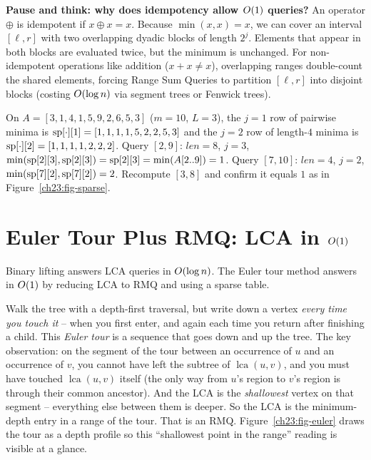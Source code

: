 \begin{recoverybox}
\textbf{Pause and think: why does idempotency allow $O(1)$ queries?}
An operator $\oplus$ is idempotent if $x \oplus x = x$. Because $\min(x, x) = x$, we can cover an interval $[\ell, r]$ with two overlapping dyadic blocks of length $2^j$. Elements that appear in both blocks are evaluated twice, but the minimum is unchanged. For non-idempotent operations like addition ($x + x \neq x$), overlapping ranges double-count the shared elements, forcing Range Sum Queries to partition $[\ell, r]$ into disjoint blocks (costing $O(\log n)$ via segment trees or Fenwick trees).
\end{recoverybox}

\begin{labbox}
On $A=[3,1,4,1,5,9,2,6,5,3]$ ($m=10$, $L=3$), the $j=1$ row of pairwise minima is
$\mathrm{sp}[\cdot][1]=[1,1,1,1,5,2,2,5,3]$ and the $j=2$ row of length-$4$ minima is
$\mathrm{sp}[\cdot][2]=[1,1,1,1,2,2,2]$. Query $[2,9]$: $\textit{len}=8$, $j=3$,
$\min(\mathrm{sp}[2][3],\mathrm{sp}[2][3])=\mathrm{sp}[2][3]=\min(A[2..9])=1$. Query $[7,10]$: $\textit{len}=4$,
$j=2$, $\min(\mathrm{sp}[7][2],\mathrm{sp}[7][2])=2$. Recompute $[3,8]$ and confirm it equals $1$ as in
Figure~\ref{ch23:fig-sparse}.
\end{labbox}

\section{Euler Tour Plus RMQ: LCA in \texorpdfstring{$O(1)$}{O(1)}}
\label{ch23:euler-lca}

Binary lifting answers LCA queries in $O(\log n)$. The Euler tour method answers in $O(1)$ by reducing LCA to RMQ and using a sparse table.

\begin{intuitionbox}
Walk the tree with a depth-first traversal, but write down a vertex \emph{every time you
touch it} -- when you first enter, and again each time you return after finishing a child.
This \emph{Euler tour} is a sequence that goes down and up the tree. The key
observation: on the segment of the tour between an occurrence of $u$ and an occurrence of
$v$, you cannot have left the subtree of $\operatorname{lca}(u,v)$, and you must have touched
$\operatorname{lca}(u,v)$ itself (the only way from $u$'s region to $v$'s region is through
their common ancestor). And the LCA is the \emph{shallowest} vertex on that segment --
everything else between them is deeper. So the LCA is the minimum-depth entry in a range of
the tour. That is an RMQ. Figure~\ref{ch23:fig-euler} draws the tour as a depth profile so
this ``shallowest point in the range'' reading is visible at a glance.
\end{intuitionbox}

